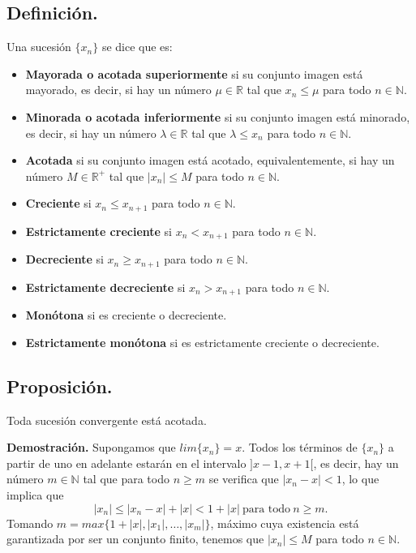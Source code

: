 \documentclass[10pt,a4paper]{article}
\begin{document}
	\subsection{Definición.} Una sucesión $\{x_n\}$ se dice que es: 
		\begin{itemize}
			\item \textbf{Mayorada o  acotada superiormente} si su conjunto imagen está mayorado, es decir, si hay un número $\mu \in \mathbb{R}$ tal que $x_n \leq \mu$ para todo $n \in \mathbb{N}$.
			\item \textbf{Minorada o acotada inferiormente} si su conjunto imagen está minorado, es decir, si hay un número $\lambda \in \mathbb{R}$ tal que $\lambda \leq x_n$ para todo $n \in \mathbb{N}$.
			\item \textbf{Acotada} si su conjunto imagen está acotado, equivalentemente, si hay un número $M \in \mathbb{R} ^+$ tal que $|x_n| \leq M$ para todo $n \in \mathbb{N}$.
			\item \textbf{Creciente} si $x_n \leq x_{n+1}$ para todo $n \in \mathbb{N}$.
			\item \textbf{Estrictamente creciente} si $x_n < x_{n+1}$ para todo $n \in \mathbb{N}$.
			\item \textbf{Decreciente} si $x_n \geq x_{n+1}$ para todo $n \in \mathbb{N}$.
			\item \textbf{Estrictamente decreciente} si $x_n > x_{n+1}$ para todo $n \in \mathbb{N}$.
			\item \textbf{Monótona} si es creciente o decreciente.
			\item \textbf{Estrictamente monótona} si es estrictamente creciente o decreciente.
		\end{itemize}
	
	\subsection{Proposición.}
	Toda sucesión convergente está acotada.
	
	\textbf{Demostración.} Supongamos que $lim\{x_n\} = x$. Todos los términos de $\{x_n\}$ a partir de uno en adelante estarán en el intervalo $] x-1, x+1[$, es decir, hay un número $m \in \mathbb{N}$ tal que para todo $n \geq m$ se verifica que $|x_n - x | < 1$, lo que implica que $$ |x_n| \leq |x_n - x| + |x| < 1 + |x| ~ \text{para todo} ~ n \geq m.$$
	Tomando $m = max\{1 + |x|, |x_1|, \dots , |x_m|\}$, máximo cuya existencia está garantizada por ser un conjunto finito, tenemos que $|x_n| \leq M$ para todo $n \in \mathbb{N}$.
	
\end{document}
